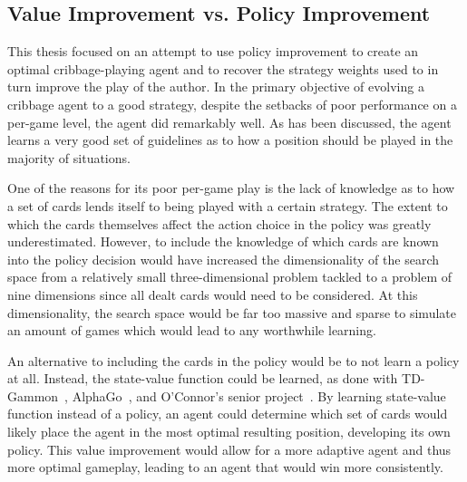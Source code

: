 

\subsection{Value Improvement vs. Policy Improvement}
\label{sec:disc-value}

This thesis focused on an attempt to use policy improvement to create an optimal
cribbage-playing agent and to recover the strategy weights used to in turn
improve the play of the author.
%
In the primary objective of evolving a cribbage agent to a good strategy,
despite the setbacks of poor performance on a per-game level,
the agent did remarkably well.
%
As has been discussed,
the agent learns a very good set of guidelines as to how a position should
be played in the majority of situations.

One of the reasons for its poor per-game play
is the lack of knowledge as to how a set of cards lends itself to being played
with a certain strategy.
%
The extent to which the cards themselves affect the action choice in the policy
was greatly underestimated.
%
However, %
to include the knowledge of which cards are known into the policy decision
would have increased the dimensionality of the search space from a relatively
small three-dimensional problem tackled to a problem of nine dimensions since
all dealt cards would need to be considered.
%
At this dimensionality,
the search space would be far too massive and sparse to simulate an amount of
games which would lead to any worthwhile learning.

An alternative to including the cards in the policy would be to not learn a
policy at all.
%
Instead,
the state-value function could be learned,
as done with TD-Gammon~\cite{tdgammon},
AlphaGo~\cite{deepmind_alphago,deepmind_alphago_zero},
and O'Connor's senior project~\cite{roconnor_cs486}.
%
By learning state-value function instead of a policy,
an agent could determine which set of cards would likely place the agent in the
most optimal resulting position,
developing its own policy.
%
This value improvement would allow for a more adaptive agent and thus more
optimal gameplay,
leading to an agent that would win more consistently.

%
